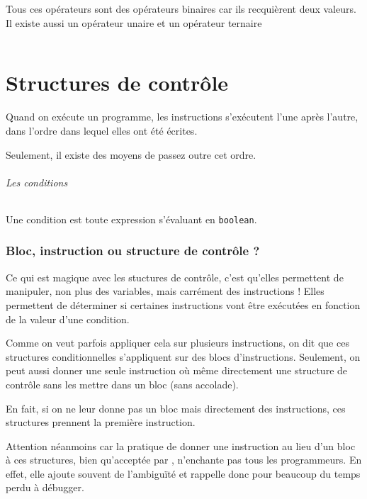 Tous ces opérateurs sont des opérateurs binaires car ils recquièrent deux
valeurs.
Il existe aussi un opérateur unaire et un opérateur ternaire
\begin{center}
  \begin{tabular}{|c|l|}
    \hline
    \hline
    \hline
  \end{tabular}
\end{center}

\part{Structures de contrôle}
Quand on exécute un programme, les instructions s'exécutent l'une après
l'autre, dans l'ordre dans lequel elles ont été écrites.

Seulement, il existe des moyens de passez outre cet ordre.

\paragraph{Les conditions}
Une condition est toute expression s'évaluant en \lstinline|boolean|.

\section{Bloc, instruction ou structure de contrôle ?}
\label{sec:bloci}
Ce qui est magique avec les stuctures de contrôle, c'est qu'elles permettent
de manipuler, non plus des variables, mais carrément des instructions !
Elles permettent de déterminer si certaines instructions vont être exécutées
en fonction de la valeur d'une condition.

Comme on veut parfois appliquer cela sur plusieurs instructions,
on dit que ces structures conditionnelles s'appliquent sur
des blocs d'instructions.
Seulement, on peut aussi donner une seule instruction où même directement
une structure de contrôle sans les mettre dans un bloc (sans accolade).

En fait, si on ne leur donne pas un bloc mais directement des instructions,
ces structures prennent la première instruction.

Attention néanmoins car la pratique de donner une instruction au lieu d'un
bloc à ces structures, bien qu'acceptée par \java{}, n'enchante pas
tous les programmeurs.
En effet, elle ajoute souvent de l'ambiguïté et rappelle donc pour beaucoup
du temps perdu à débugger.

